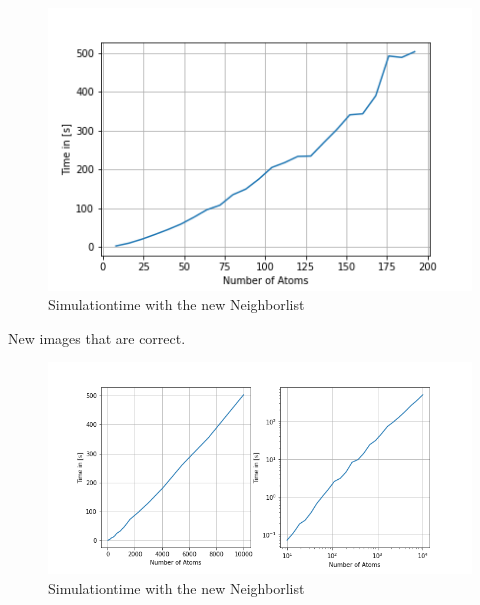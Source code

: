 \begin{figure}[!h]
	\begin{center}
		\includegraphics[scale=1]{Figure/plotAtomTimesNew.png}
	\end{center}
	\caption[Simulationtime with the new Neighborlist]{Simulationtime with the new Neighborlist  }
	\label{PlotAtomTimesCutoff}
\end{figure}
New images that are correct.
\begin{figure}[!h]
	\begin{center}
		\includegraphics[scale=1.25]{Figure/plotAtomTimesMoreData.png}
	\end{center}
	\caption[Simulationtime with the new Neighborlist]{Simulationtime with the new Neighborlist  }
	\label{PlotAtomTimesCutoffNew}
\end{figure}



